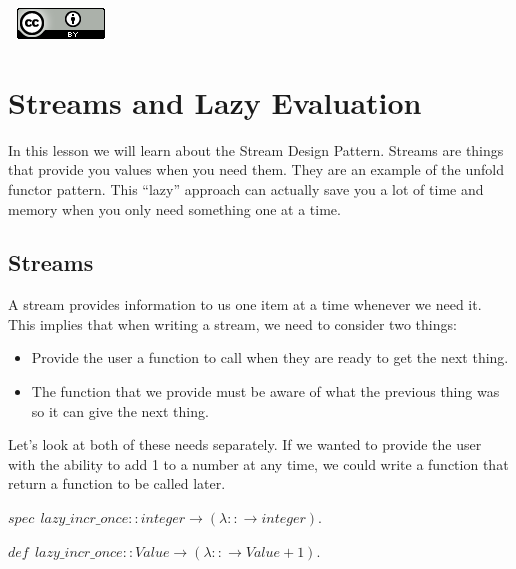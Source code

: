 \documentclass[
]{book}
\providecommand{\tightlist}{%
  \setlength{\itemsep}{0pt}\setlength{\parskip}{0pt}}
\begin{document}
\(\nonumber\)
\(\nonumber\)
\href{http://creativecommons.org/licenses/by/4.0/}{\includegraphics{images/cc-88x31.png}}

\hypertarget{streams-and-lazy-evaluation}{%
\chapter{Streams and Lazy Evaluation}\label{streams-and-lazy-evaluation}}

In this lesson we will learn about the Stream Design Pattern. Streams are things that provide you values when you need them. They are an example of the unfold functor pattern. This ``lazy'' approach can actually save you a lot of time and memory when you only need something one at a time.

\hypertarget{streams}{%
\section{Streams}\label{streams}}

A stream provides information to us one item at a time whenever we need it. This implies that when writing a stream, we need to consider two things:

\begin{itemize}
\tightlist
\item
  Provide the user a function to call when they are ready to get the next thing.
\item
  The function that we provide must be aware of what the previous thing was so it can give the next thing.
\end{itemize}

Let's look at both of these needs separately. If we wanted to provide the user with the ability to add 1 to a number at any time, we could write a function that return a function to be called later.

\begin{formulabox}
\(spec ~ ~ lazy\_incr\_once :: integer \rightarrow (\lambda :: \rightarrow integer).\)

\(de\mathit{f} ~ ~ lazy\_incr\_once :: Value \rightarrow (\lambda :: \rightarrow Value + 1).\)

\end{formulabox}

\(\nonumber\)
\end{document}
